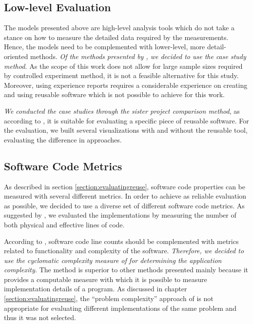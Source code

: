 \subsection{Low-level Evaluation}

The models presented above are high-level analysis tools which do not take a stance on how to measure the detailed data required by the measurements. Hence, the models need to be complemented with lower-level, more detail-oriented methods. \emph{Of the methods presented by \citet{mohagheghi_quality_2007}, we decided to use the case study method.} As the scope of this work does not allow for large sample sizes required by controlled experiment method, it is not a feasible alternative for this study. Moreover, using experience reports requires a considerable experience on creating and using reusable software which is not possible to achieve for this work.

\emph{We conducted the case studies through the sister project comparison method}, as according to \citet{mohagheghi_quality_2007}, it is suitable for evaluating a specific piece of reusable software. For the evaluation, we built several visualizations with and without the reusable tool, evaluating the difference in approaches.

\subsection{Software Code Metrics}

As described in section \ref{section:evaluatingreuse}, software code properties can be measured with several different metrics. In order to achieve as reliable evaluation as possible, we decided to use a diverse set of different software code metrics. As suggested by \citet{fenton_software_1998}, we evaluated the implementations by measuring the number of both physical and effective lines of code.

According to \citet{fenton_software_1998}, software code line counts should be complemented with metrics related to functionality and complexity of the software. \emph{Therefore, we decided to use the cyclomatic complexity measure of \citet{mccabe_complexity_1976} for determining the application complexity.} The method is superior to other methods presented mainly because it provides a computable measure with which it is possible to measure implementation details of a program. As discussed in chapter \ref{section:evaluatingreuse}, the ``problem complexity'' approach of \citet{fenton_software_1998} is not appropriate for evaluating different implementations of the same problem and thus it was not selected.

